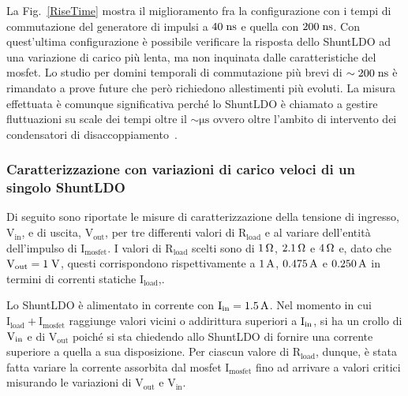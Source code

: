 La Fig.~\ref{RiseTime} mostra il miglioramento fra la configurazione con i tempi di commutazione del generatore di impulsi a $40 \rm \; ns$ e quella con $200 \rm \; ns$. Con quest'ultima configurazione è possibile verificare la risposta dello ShuntLDO ad una variazione di carico più lenta, ma non inquinata dalle caratteristiche del mosfet. Lo studio per domini temporali di commutazione pi\`u brevi di $\sim 200\rm \; ns$ \`e rimandato a prove future che per\`o richiedono allestimenti pi\`u evoluti. La misura effettuata \`e comunque significativa perch\'e lo ShuntLDO \`e chiamato a gestire fluttuazioni su scale dei tempi oltre il $\sim \mathrm{\mu s}$ ovvero oltre l'ambito di intervento dei condensatori di disaccoppiamento~\cite{saramarconi}.
 

\subsubsection{Caratterizzazione con variazioni di carico veloci di un singolo ShuntLDO}

Di seguito sono riportate le misure di caratterizzazione della tensione di ingresso, $\mathrm{V_{in}}$, e di uscita, $\mathrm{V_{out}}$, per tre differenti valori di $\mathrm{R_{load}}$ e al variare dell'entit\`a dell'impulso di $\mathrm{I_{mosfet}}$.
I valori di $\mathrm{R_{load}}$ scelti sono di $1{\rm \, \Omega}$, $2.1{\rm \, \Omega}$ e $4{\rm \, \Omega}$ e, dato che $\mathrm{V_{out}=1\rm \; V}$, questi corrispondono rispettivamente a $1\rm \, A$, $0.475\rm \, A$ e $0.250\rm \, A$ in termini di correnti statiche $\mathrm{I_{load}}$,.

Lo ShuntLDO è alimentato in corrente con $\mathrm{I_{in}} = 1.5\rm \, A$. Nel momento in cui $\mathrm{I_{load}+I_{mosfet}}$ raggiunge valori vicini o addirittura superiori  a $\mathrm{I_{in}}$, si ha un crollo di $\mathrm{V_{in}}$ e di $\mathrm{V_{out}}$ poiché si sta chiedendo allo ShuntLDO di fornire una corrente superiore a quella a sua disposizione.
Per ciascun valore di $\mathrm{R_{load}}$, dunque, è stata fatta variare la corrente assorbita dal mosfet $\mathrm{I_{mosfet}}$ fino ad arrivare a valori critici misurando le variazioni di $\mathrm{V_{out}}$ e $\mathrm{V_{in}}$. 

